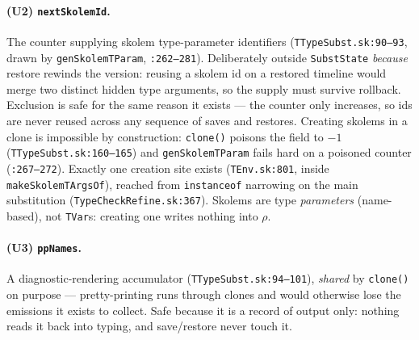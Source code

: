 \documentclass[11pt]{article}
\begin{document}
\paragraph{(U2) \texttt{nextSkolemId}.}
The counter supplying skolem type-parameter identifiers
(\texttt{TTypeSubst.sk:90--93}, drawn by \texttt{genSkolemTParam},
\texttt{:262--281}). Deliberately outside \texttt{SubstState}
\emph{because} restore rewinds the version: reusing a skolem id on a
restored timeline would merge two distinct hidden type arguments, so the
supply must survive rollback. Exclusion is safe for the same reason it
exists — the counter only increases, so ids are never reused across any
sequence of saves and restores. Creating skolems in a clone is impossible by
construction: \texttt{clone()} poisons the field to $-1$
(\texttt{TTypeSubst.sk:160--165}) and \texttt{genSkolemTParam} fails
hard on a poisoned counter (\texttt{:267--272}). Exactly one creation site
exists (\texttt{TEnv.sk:801}, inside \texttt{makeSkolemTArgsOf}),
reached from \texttt{instanceof} narrowing on the main substitution
(\texttt{TypeCheckRefine.sk:367}). Skolems are type \emph{parameters}
(name-based), not \texttt{TVar}s: creating one writes nothing into
$\rho$.

\paragraph{(U3) \texttt{ppNames}.}
A diagnostic-rendering accumulator (\texttt{TTypeSubst.sk:94--101}),
\emph{shared} by \texttt{clone()} on purpose — pretty-printing runs
through clones and would otherwise lose the emissions it exists to
collect. Safe because it is a record of output only: nothing reads it
back into typing, and save/restore never touch it.
\end{document}
